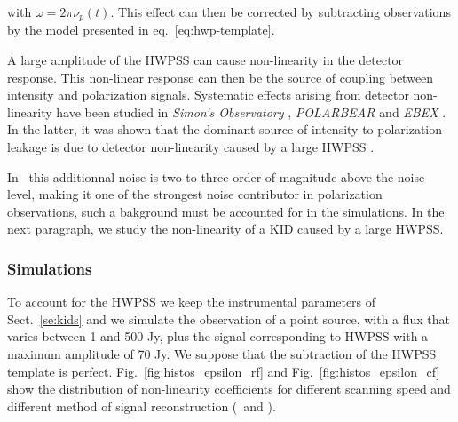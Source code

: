 with $\omega = 2 \pi \nu_{p}(t)$.
This effect can then be corrected by subtracting observations by the model presented in eq.~\ref{eq:hwp-template}. 

A large amplitude of the HWPSS can cause non-linearity in the detector response. This non-linear response can then be the source of coupling between intensity and polarization signals. Systematic effects arising from detector non-linearity have been studied in \emph{Simon's Observatory} \citep{2018SPIE10708E..48S}, \emph{POLARBEAR} \citep{2017JCAP...05..008T} and \emph{EBEX} \citep{2017arXiv171101314D}. In the latter, it was shown that the dominant source of intensity to polarization leakage is due to detector non-linearity caused by a large HWPSS \citep{2017arXiv171101314D}.

In \nikad\ this additionnal noise is two to three order of magnitude above the noise level, making it one of the strongest noise contributor in polarization observations, such a bakground must be accounted for in the simulations. In the next paragraph, we study the non-linearity of a KID caused by a large HWPSS. 


\subsubsection{Simulations}

To account for the HWPSS we keep the instrumental parameters of Sect.~\ref{se:kids} and we simulate the observation of a point source, with a flux that varies between 1 and 500 Jy, plus the signal corresponding to HWPSS with a maximum amplitude of 70 Jy. We suppose that the subtraction of the HWPSS template is perfect. Fig.~\ref{fig:histos_epsilon_rf} and Fig.~\ref{fig:histos_epsilon_cf} show the distribution of non-linearity coefficients for different scanning speed and different method of signal reconstruction (\methodu\ and \methodd). 

